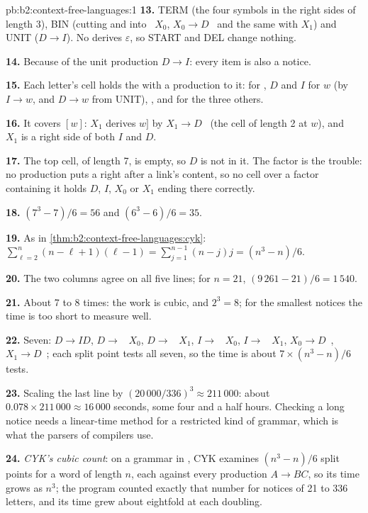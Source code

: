 \begin{solution}{pb:b2:context-free-languages:1}
\textbf{13.} TERM (the four symbols in the right sides of length 3), BIN (cutting  and \code{[D]} into
~$X_0$, $X_0 \to D$~ and the same with $X_1$) and UNIT ($D \to I$). No  derives
$\varepsilon$, so START and DEL change nothing.

\textbf{14.} Because of the unit production $D \to I$: every item is also a notice.

\textbf{15.} Each letter's cell holds the  with a production to it:  for \code{<}, $D$ and $I$ for
$w$ (by $I \to w$, and $D \to w$ from UNIT), \code{'['}, \code{']'} and  for the three others.

\textbf{16.} It covers $[w]$: $X_1$ derives $w]$ by $X_1 \to D$~\code{']'} (the cell of length 2 at $w$), and
\code{'['}~$X_1$ is a right side of both $I$ and $D$.

\textbf{17.} The top cell, of length 7, is empty, so $D$ is not in it. The factor \code{[w>} is the trouble: no production
puts a \code{>} right after a link's content, so no cell over a factor containing it holds $D$, $I$, $X_0$ or $X_1$ ending
there correctly.

\textbf{18.} $(7^3 - 7)/6 = 56$ and $(6^3 - 6)/6 = 35$.

\textbf{19.} As in \cref{thm:b2:context-free-languages:cyk}: $\sum_{\ell=2}^{n} (n - \ell + 1)(\ell - 1) = \sum_{j=1}^{n-1}
(n - j)j = (n^3 - n)/6$.

\textbf{20.} The two columns agree on all five lines; for $n = 21$, $(9\,261 - 21)/6 = 1\,540$.

\textbf{21.} About 7 to 8 times: the work is cubic, and $2^3 = 8$; for the smallest notices the time is too short to
measure well.

\textbf{22.} Seven: $D \to ID$, $D \to$ ~$X_0$, $D \to$ \code{'['}~$X_1$, $I \to$ ~$X_0$, $I \to$
\code{'['}~$X_1$, $X_0 \to D$~, $X_1 \to D$~\code{']'}; each split point tests all seven, so the time is
about $7 \times (n^3 - n)/6$ tests.

\textbf{23.} Scaling the last line by $(20\,000/336)^3 \approx 211\,000$: about $0.078 \times 211\,000 \approx
16\,000$ seconds, some four and a half hours. Checking a long notice needs a linear-time method for a restricted kind
of grammar, which is what the parsers of compilers use.

\textbf{24.} \emph{CYK's cubic count}: on a grammar in , CYK examines $(n^3 - n)/6$ split points
for a word of length $n$, each against every production $A \to BC$, so its time grows as $n^3$; the program counted
exactly that number for notices of 21 to 336 letters, and its time grew about eightfold at each doubling.
\end{solution}
